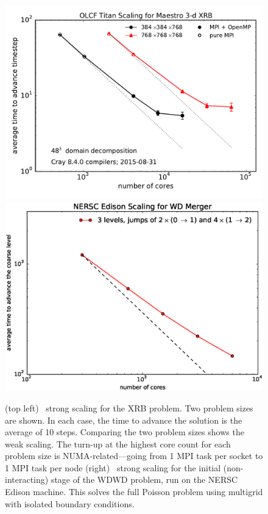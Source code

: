 \begin{figure}[t]
\centering
\includegraphics[width=0.49\linewidth]{titan_xrb_scaling}
\includegraphics[width=0.49\linewidth]{edison-wdmerger-scaling.eps}
\caption{\label{fig:scaling} (top left) \maestro\ strong scaling for
  the XRB problem.  Two problem sizes are shown.  In each case, the
  time to advance the solution is the average of 10 steps.  Comparing
  the two problem sizes shows the weak scaling.  The turn-up at the
  highest core count for each problem size is NUMA-related---going
  from 1 MPI task per socket to 1 MPI task per node (right)
  \castro\ strong scaling for the initial (non-interacting) stage of
  the WDWD problem, run on the NERSC Edison machine.  This solves the
  full Poisson problem using multigrid with isolated boundary
  conditions.}
\end{figure}


